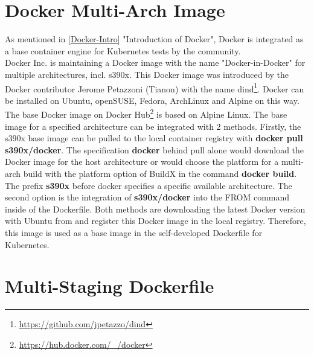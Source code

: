 \section{Docker Multi-Arch Image}
As mentioned in \ref{Docker-Intro} "Introduction of Docker", Docker is integrated as a base container engine for Kubernetes tests by the community. \\  
Docker Inc. is maintaining a Docker image with the name "Docker-in-Docker" for multiple architectures, incl. s390x. 
This Docker image was introduced by the Docker contributor Jerome Petazzoni (Tianon) with the name dind\footnote{\url{https://github.com/jpetazzo/dind}}. Docker can be installed on Ubuntu, openSUSE, Fedora, ArchLinux and Alpine on this way.
The base Docker image on Docker Hub\footnote{\url{https://hub.docker.com/_/docker}} is based on Alpine Linux.
The base image for a specified architecture can be integrated with 2 methods. Firstly, the s390x base image can be pulled to the local container registry with \textbf{docker pull s390x/docker}. The specification \textbf{docker} behind pull alone would download the Docker image for the host architecture or would choose the platform for a multi-arch build with the platform option of BuildX in the command \textbf{docker build}. The prefix \textbf{s390x} before docker specifies a specific available architecture. 
The second option is the integration of \textbf{s390x/docker} into the FROM command inside of the Dockerfile. Both methods are downloading the latest Docker version with Ubuntu from  and register this Docker image in the local registry.
Therefore, this image is used as a base image in the self-developed Dockerfile for Kubernetes.



\section{Multi-Staging Dockerfile}

